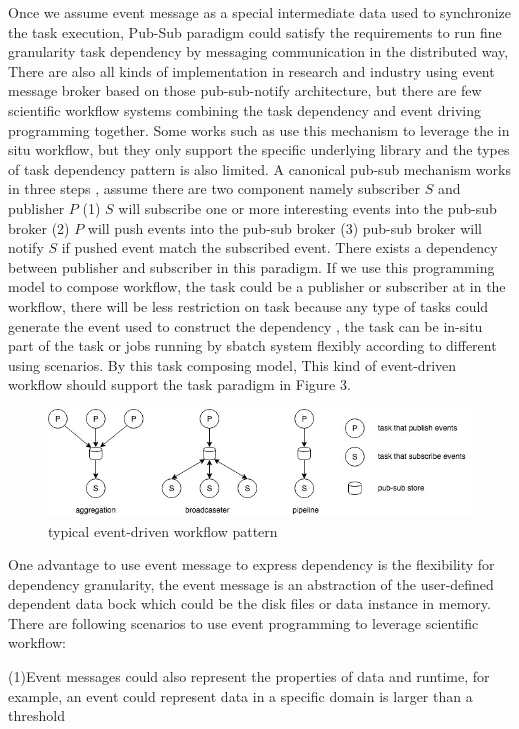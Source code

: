 Once we assume event message as a special intermediate data used to synchronize the task execution, Pub-Sub paradigm \cite{eugster2003many} could satisfy the requirements to run fine granularity task dependency by messaging communication in the distributed way, There are also all kinds of implementation in research and industry using event message broker based on those pub-sub-notify architecture\cite{hivemq,jin2012scalable,redispubsub}, but there are few scientific workflow systems combining the task dependency and event driving programming together. Some works such as \cite{jin2012scalable} use this mechanism to leverage the in situ workflow, but they only support the specific underlying library and the types of task dependency pattern is also limited. A canonical pub-sub mechanism works in three steps , assume there are two component namely subscriber $S$ and publisher $P$ (1) $S$ will subscribe one or more interesting events into the pub-sub broker (2) $P$ will push events into the pub-sub broker (3)  pub-sub broker will notify $S$ if pushed event match the subscribed event. There exists a dependency between publisher and subscriber in this paradigm. If we use this programming model to compose workflow, the task could be a publisher or subscriber at in the workflow, there will be less restriction on task because any type of tasks could generate the event used to construct the dependency , the task can be in-situ part of the task or jobs running by sbatch system flexibly according to different using scenarios. By this task composing model,  This kind of event-driven workflow should support the task paradigm in Figure 3.
\begin{figure} 
\centering
\includegraphics[width=.8\linewidth]{./figure/edtaskpattern.jpg}
\caption{typical event-driven workflow pattern}
 \label{fg:state}
\end{figure} 
One advantage to use event message to express dependency is the flexibility for dependency granularity, the event message is an abstraction of the user-defined dependent data bock which could be the disk files or data instance in memory. 
There are following scenarios to use event programming to leverage scientific workflow:

(1)Event messages could also represent the properties of data and runtime, for example, an event could represent data in a specific domain is larger than a threshold

